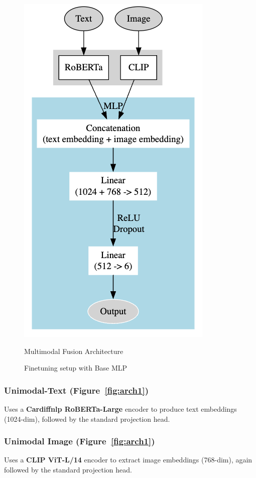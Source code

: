 \begin{figure}[ht]
\begin{minipage}{0.49\textwidth}
        \includegraphics[height=0.5\textheight]{images/multimodal.png}
        \caption{Multimodal Fusion Architecture}
        \label{fig:arch2}
    \end{minipage}
    \caption{Finetuning setup with Base MLP}
    \label{fig:architecture}
\end{figure}

\subsubsection*{Unimodal-Text (Figure~\ref{fig:arch1})}
Uses a \textbf{Cardiffnlp RoBERTa-Large} encoder to produce text embeddings (1024-dim), followed by the standard projection head.

\subsubsection*{Unimodal Image (Figure~\ref{fig:arch1})}
Uses a \textbf{CLIP ViT-L/14} encoder to extract image embeddings (768-dim), again followed by the standard projection head.

